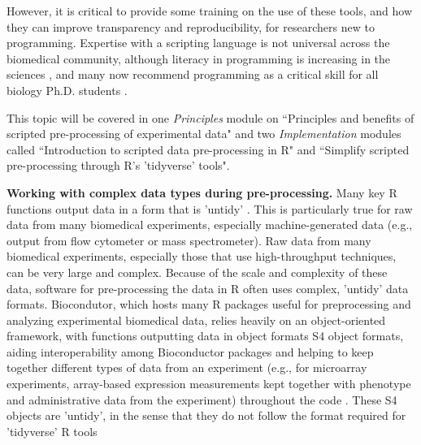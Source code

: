 \documentclass[pdftex,english,11pt,parskip=half]{scrartcl}
\begin{document}
However, it is critical to provide some
training on the use of these tools, and how they can improve transparency and reproducibility, for researchers new to programming. Expertise
with a scripting language is not universal across the biomedical community,
although literacy in programming is increasing in the sciences
\cite{ram2013git}, and many now recommend programming as a critical skill for
all biology Ph.D. students \cite{list2017ten}. 

This topic will be covered in one
\textit{Principles} module on ``Principles and benefits of scripted
pre-processing of experimental data" and two \textit{Implementation} modules
called ``Introduction to scripted data pre-processing in R" and ``Simplify
scripted pre-processing through R's 'tidyverse' tools".

\textbf{Working with complex data types during pre-processing.} Many key R functions output data in a form that is 'untidy' \cite{robinson2014broom}. This is particularly true for raw data from many biomedical experiments, especially machine-generated data (e.g., output from flow cytometer or mass spectrometer). Raw data from many biomedical experiments, especially those that
use high-throughput techniques, can be very large and complex. Because of the 
scale and complexity of these data, software for pre-processing the data in R
often uses complex, 'untidy' data formats. Biocondutor, which hosts many R packages useful for preprocessing and analyzing experimental biomedical data, relies heavily on an object-oriented framework, with functions outputting data in object formats S4 object formats, aiding interoperability among Bioconductor packages and helping to keep together different types of data from an experiment (e.g., for microarray experiments, array-based expression measurements kept together with phenotype and administrative data from the experiment) throughout the code \cite{gentleman2004bioconductor}. These S4 objects are 'untidy', in the sense that they do not follow the format required for 'tidyverse' R tools \cite{biobroom}
\end{document}
